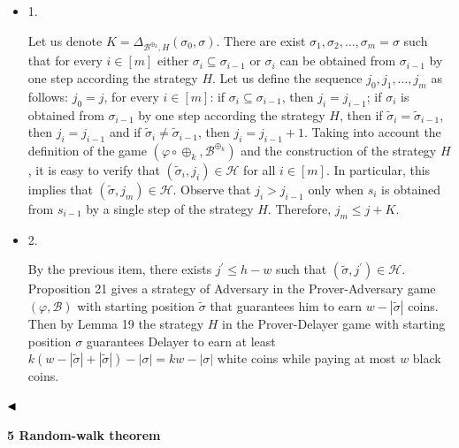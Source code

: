 \documentclass[10pt,a4paper]{article}
\begin{document}
\begin{itemize}


\item 
1. 


Let us denote $K=\Delta_{\mathcal{B}^{\oplus_{k}},H}(\sigma_{0},\sigma)$.
There are exist $\sigma_{1},\sigma_{2},\dots,\sigma_{m}=\sigma$ such that
for every $i\in[m]$ either
$\sigma_{i}\subseteq\sigma_{i-1}$ or $\sigma_{i}$ can be obtained from $\sigma_{i-1}$ by one step according the strategy $H$.
Let us define the sequence $j_{0},j_{1},\dots,j_{m}$ as follows: $j_{0}=j$, for every $i\in[m]$:
if $\sigma_{i}\subseteq\sigma_{i-1}$, then $j_{i}=j_{i-1}$;
if $\sigma_{i}$ is obtained from $\sigma_{i-1}$ by one step according the strategy $H$, then if $\tilde{\sigma}_{i}=\tilde{\sigma}_{i-1}$,
then $j_{i}=j_{i-1}$ and if $\tilde{\sigma}_{i}\neq\tilde{\sigma}_{i-1}$, then $j_{i}=j_{i-1}+1$.
Taking into account the definition of the game $(\varphi\circ\oplus_{k},\mathcal{B}^{\oplus_{k}})$ and the construction of the strategy $H$, it is easy to verify that $(\tilde{\sigma}_{i},j_{i})\in\mathcal{H}$ for all $i\in[m]$. In particular, this implies that $(\tilde{\sigma},j_{m})\in\mathcal{H}$.
Observe that $j_{i}>j_{i-1}$ only when $s_{i}$ is obtained from $s_{i-1}$ by a single step of the strategy $H$. Therefore, $j_{m}\leq j+K$.\par





\item 
2. 


By the previous item, there exists $j^{\prime}\leq h-w$ such that $(\tilde{\sigma},j^{\prime})\in\mathcal{H}$. Proposition 21 gives a strategy of Adversary in the Prover-Adversary game $(\varphi,\mathcal{B})$ with starting position $\tilde{\sigma}$ that guarantees him to earn $w-|\tilde{\sigma}|$ coins. Then by Lemma 19 the strategy $H$ in the Prover-Delayer game with starting position $\sigma$ guarantees Delayer to earn at least $k(w-|\tilde{\sigma}|+|\tilde{\sigma}|)-|\sigma|=kw-|\sigma|$ white coins while paying at most $w$ black coins.\par





\end{itemize}


$\hfill\blacktriangleleft$\par


\par\medskip\noindent\textbf{
5 Random-walk theorem}\par
\end{document}
